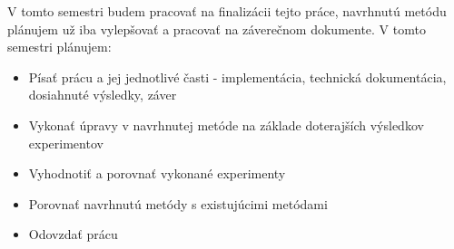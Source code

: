     V tomto semestri budem pracovať na finalizácii tejto práce, navrhnutú metódu plánujem už iba vylepšovať a pracovať na záverečnom dokumente. V tomto semestri plánujem:
        
    \begin{itemize}
        \item Písať prácu a jej jednotlivé časti - implementácia, technická dokumentácia, dosiahnuté výsledky, záver
        \item Vykonať úpravy v navrhnutej metóde na základe doterajších výsledkov experimentov
        \item Vyhodnotiť a porovnať vykonané experimenty
        \item Porovnať navrhnutú metódy s existujúcimi metódami
        \item Odovzdať prácu
    \end{itemize}
    
    